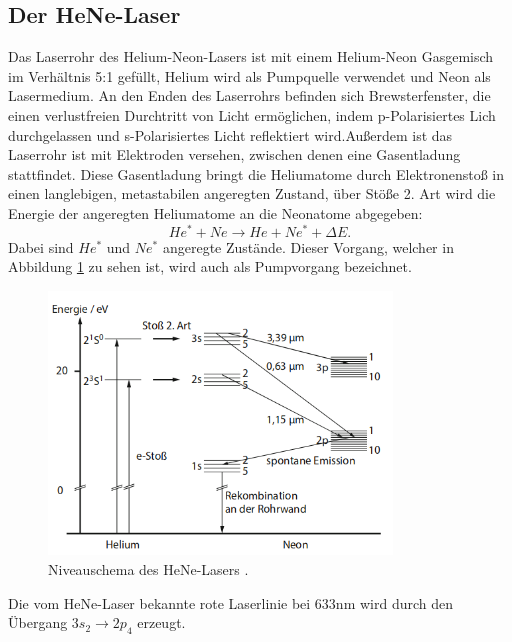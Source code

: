 \subsection{Der HeNe-Laser}
Das Laserrohr des Helium-Neon-Lasers ist mit einem Helium-Neon Gasgemisch im Verhältnis 5:1 gefüllt,
Helium wird als Pumpquelle verwendet und Neon als Lasermedium. An den Enden des Laserrohrs befinden sich
Brewsterfenster, die einen verlustfreien Durchtritt von Licht ermöglichen, indem p-Polarisiertes Lich
durchgelassen und s-Polarisiertes Licht reflektiert wird.Außerdem ist das Laserrohr ist mit Elektroden versehen,
zwischen denen eine Gasentladung stattfindet. Diese Gasentladung bringt die Heliumatome durch Elektronenstoß in einen
langlebigen, metastabilen angeregten Zustand, über Stöße 2. Art wird die Energie der angeregten Heliumatome an die
Neonatome abgegeben:
\begin{equation}
  He^* + Ne \rightarrow He + Ne^* + \Delta E.
\end{equation}
Dabei sind $He^*$ und $Ne^*$ angeregte Zustände. Dieser Vorgang, welcher in Abbildung \ref{fig:entladung} zu sehen ist,
wird auch als Pumpvorgang bezeichnet.

\begin{figure}[H]
  \centering
  \includegraphics[height=7cm]{Entladung.png}
  \caption{Niveauschema des HeNe-Lasers \cite{springer2}.}
  \label{fig:entladung}
\end{figure}

Die vom HeNe-Laser bekannte rote Laserlinie bei 633\;nm wird durch den Übergang $3s_2 \rightarrow 2p_4$
erzeugt.

